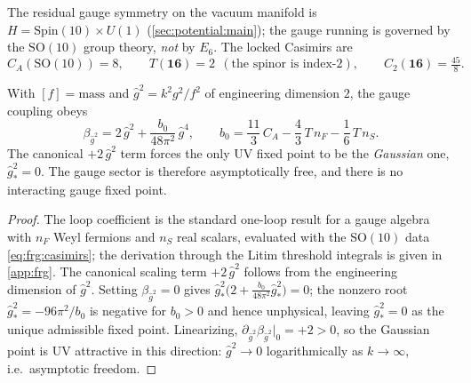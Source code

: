 The residual gauge symmetry on the vacuum manifold is $H=\mathrm{Spin}(10)\times U(1)$
(\autoref{sec:potential:main}); the gauge running is governed by the
\emph{$\mathrm{SO}(10)$} group theory, \emph{not} by $E_{6}$. The locked
Casimirs are
\begin{equation}\label{eq:frg:casimirs}
  C_{A}\!\left(\mathrm{SO}(10)\right)=8,\qquad
  T(\mathbf{16})=2\ \ (\text{the spinor is index-}2),\qquad
  C_{2}(\mathbf{16})=\tfrac{45}{8}.
\end{equation}

\begin{theorem}
\label{thm:frg:gauge}
With $[f]=\text{mass}$ and $\hat g^{2}=k^{2}g^{2}/f^{2}$ of engineering
dimension $2$, the gauge coupling obeys
\begin{equation}\label{eq:frg:betag}
  \beta_{\hat g^{2}}
  = 2\,\hat g^{2}
    + \frac{b_{0}}{48\pi^{2}}\,\hat g^{4},
  \qquad
  b_{0}=\frac{11}{3}\,C_{A}-\frac{4}{3}\,T\,n_{F}-\frac16\,T\,n_{S}.
\end{equation}
The canonical $+2\,\hat g^{2}$ term forces the only UV fixed point to be
the \emph{Gaussian} one, $\hat g^{2}_{\ast}=0$. The gauge sector is
therefore asymptotically free, and there is no interacting gauge fixed
point.
\end{theorem}

\begin{proof}
The loop coefficient is the standard one-loop result for a gauge algebra
with $n_{F}$ Weyl fermions and $n_{S}$ real scalars, evaluated with the
$\mathrm{SO}(10)$ data \eqref{eq:frg:casimirs}; the derivation through the
Litim threshold integrals is given in \autoref{app:frg}. The canonical
scaling term $+2\,\hat g^{2}$ follows from the engineering dimension of
$\hat g^{2}$. Setting $\beta_{\hat g^{2}}=0$ gives
$\hat g^{2}_{\ast}\bigl(2+\tfrac{b_{0}}{48\pi^{2}}\hat g^{2}_{\ast}\bigr)=0$;
the nonzero root $\hat g^{2}_{\ast}=-96\pi^{2}/b_{0}$ is negative for
$b_{0}>0$ and hence unphysical, leaving $\hat g^{2}_{\ast}=0$ as the unique
admissible fixed point. Linearizing, $\partial_{\hat g^{2}}\beta_{\hat g^{2}}|_{0}=+2>0$,
so the Gaussian point is UV attractive in this direction: $\hat g^{2}\to0$
logarithmically as $k\to\infty$, i.e.\ asymptotic freedom.
\end{proof}

